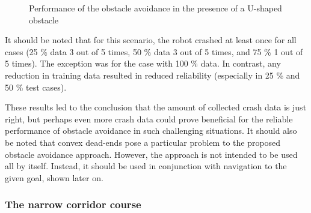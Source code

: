 \begin{figure}
    \centering
    \hfill
    \caption{Performance of the obstacle avoidance in the presence of a U-shaped obstacle}
    \label{fig:Fig09}
\end{figure}

It should be noted that for this scenario, the robot crashed at least once for all cases (25 \% data 3 out of 5 times, 50 \% data 3 out of 5 times, and 75 \% 1 out of 5 times). The exception was for the case with 100 \% data. In contrast, any reduction in training data resulted in reduced reliability (especially in 25 \% and 50 \% test cases).

These results led to the conclusion that the amount of collected crash data is just right, but perhaps even more crash data could prove beneficial for the reliable performance of obstacle avoidance in such challenging situations. It should also be noted that convex dead-ends pose a particular problem to the proposed obstacle avoidance approach. However, the approach is not intended to be used all by itself. Instead, it should be used in conjunction with navigation to the given goal, shown later on.

\subsubsection{The narrow corridor course}

